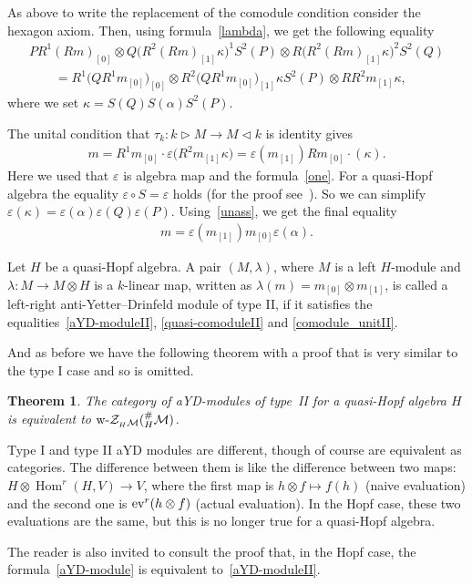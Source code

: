 \documentclass[10pt,a4paper]{amsart}
\newcommand{\Zc}{\mathcal{Z}}
\newcommand{\hmod}{{_H\mathcal{M}}}
\newcommand{\hhash}{{^{\#}_H \mathcal{M}}}
\newcommand{\la}{\triangleright}
\newcommand{\ra}{\triangleleft}
\numberwithin{equation}{section}
\newtheorem{Theorem}{Theorem}[section]
\begin{document}
As above to write the replacement of the comodule condition consider the hexagon axiom. Then, using formula~\eqref{lambda}, we get the following equality
 \begin{gather}
 PR^1(Rm)_{[0]} \otimes Q\big(R^2(Rm)_{[1]} \kappa \big)^1S^2(P) \otimes R \big(R^2(Rm)_{[1]} \kappa \big)^2 S^2(Q)\nonumber\\
\qquad{} =R^1 \big(QR^1m_{[0]}\big)_{[0]} \otimes R^2 \big(QR^1m_{[0]}\big)_{[1]} \kappa S^2(P) \otimes RR^2m_{[1]} \kappa, \label{quasi-comoduleII}
 \end{gather}
 where we set $\kappa = S(Q) S(\alpha) S^2(P)$.

 The unital condition that $\tau_k\colon k \la M \rightarrow M \ra k$ is identity gives
 \begin{gather*}
 m = R^1 m_{[0]} \cdot \varepsilon\big(R^2 m_{[1]} \kappa\big) = \varepsilon(m_{[1]}) R m_{[0]} \cdot(\kappa).
 \end{gather*}
 Here we used that $\varepsilon$ is algebra map and the formula~\eqref{one}. For a quasi-Hopf algebra the equality $\varepsilon \circ S = \varepsilon $ holds (for the proof see~\cite{Drinfeld}). So we can simplify $\varepsilon(\kappa) = \varepsilon(\alpha) \varepsilon(Q) \varepsilon (P) $. Using~\eqref{unass}, we get the final equality
\begin{gather} \label{comodule_unitII}
 m = \varepsilon(m_{[1]}) m_{[0]} \varepsilon(\alpha).
\end{gather}

 \begin{Definition}Let $H$ be a quasi-Hopf algebra. A pair $(M, \lambda)$, where $M$ is a left $H$-module and $\lambda\colon M \rightarrow M\otimes H$ is a $k$-linear map, written as $\lambda(m) = m_{[0]} \otimes m_{[1]} $, is called a left-right anti-Yetter--Drinfeld module of type II, if it satisfies the equalities~\eqref{aYD-moduleII}, \eqref{quasi-comoduleII} and \eqref{comodule_unitII}.
 \end{Definition}

 And as before we have the following theorem with a proof that is very similar to the type I case and so is omitted.

\begin{Theorem}The category of aYD-modules of type~II for a quasi-Hopf algebra $H$ is equivalent to $\text{\rm w-}\Zc_\hmod(\hhash)$.
 \end{Theorem}

\begin{Remark}Type I and type II aYD modules are different, though of course are equivalent as categories. The difference between them is like the difference between two maps: $H \otimes \operatorname{Hom}^r(H,V) \rightarrow V $, where the first map is $ h \otimes f \mapsto f(h)$ (naive evaluation) and the second one is $\text{\rm ev}^r(h\otimes f) $ (actual evaluation). In the Hopf case, these two evaluations are the same, but this is no longer true for a quasi-Hopf algebra.

The reader is also invited to consult the proof \cite[Lemma~2.2]{hks} that, in the Hopf case, the formula~\eqref{aYD-module} is equivalent to~\eqref{aYD-moduleII}.
 \end{Remark}
\end{document}
